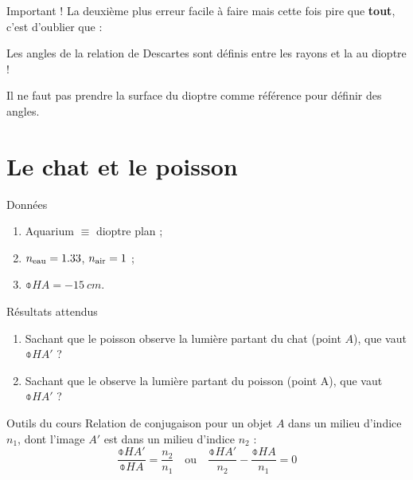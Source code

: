 \documentclass[10pt,a5paper,notitlepage]{book}
\begin{document}
\begin{NCimpo}{Important !}
    La deuxième plus  erreur facile à faire mais cette fois pire que
    \textbf{tout}, c'est d'oublier que :
    \begin{center}
        \huge Les angles de la relation de Descartes sont définis entre les
        rayons et la  au dioptre !
    \end{center}
    Il ne faut pas prendre la surface du dioptre comme référence pour définir
    des angles.
\end{NCimpo}

\section{Le chat et le poisson}
\begin{NCdefi}{Données}
    \begin{enumerate}
        \item Aquarium $\equiv$ dioptre plan ;
        \item $n _{\text{eau}} = 1.33$, $n _{\text{air}} = 1$ ;
        \item $\obar{HA} = \SI{-15}{cm}$.
    \end{enumerate}
\end{NCdefi}

\begin{NCprop}{Résultats attendus}
    \begin{enumerate}
        \item Sachant que le poisson observe la lumière partant du chat (point
            $A$), que vaut $\obar{HA'}$ ?
        \item Sachant que le  observe la lumière partant du poisson
            (point A), que vaut $\obar{HA'}$ ?
    \end{enumerate}
\end{NCprop}

\begin{NCdemo}{Outils du cours}
    Relation de conjugaison pour un objet $A$ dans un milieu d'indice $n_1$,
    dont l'image $A'$ est dans un milieu d'indice $n_2$ :
    \[ \frac{\obar{HA'}}{\obar{HA}} = \frac{n_2}{n_1} \quad \mathrm{ou} \quad
    \frac{\obar{HA'}}{n_2} - \frac{\obar{HA}}{n_1} = 0 \]
\end{NCdemo}
\end{document}
